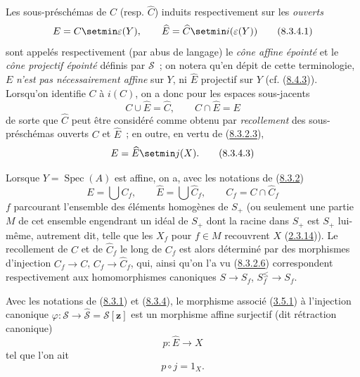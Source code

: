 \begin{env}[8.3.4]
\label{II.8.3.4-fr}
Les sous-préschémas de $C$ (resp. $\widehat{C}$) induits respectivement sur
les \emph{ouverts}
\begin{equation}
\label{II.8.3.4.1-fr}
  E=C\setmin\varepsilon(Y),\qquad
  \widehat{E}=\widehat{C}\setmin i(\varepsilon(Y))
\tag{8.3.4.1}
\end{equation}
sont appelés respectivement (par abus de langage) le \emph{cône affine
épointé} et le \emph{cône projectif épointé} définis par $\mathcal{S}$~; on
notera qu'en dépit de cette terminologie, $E$ \emph{n'est pas nécessairement
affine} sur $Y$, ni $\widehat{E}$ projectif sur $Y$
(cf. (\hyperref[II.8.4.3-fr]{8.4.3})). Lorsqu'on identifie $C$ à $i(C)$, on a
donc pour les espaces sous-jacents
\begin{equation}
\label{II.8.3.4.2-fr}
  C\cup\widehat{E}=\widehat{C},\qquad C\cap\widehat{E}=E
\tag{8.3.4.2}
\end{equation}
de sorte que $\widehat{C}$ peut être considéré comme obtenu par
\emph{recollement} des sous-préschémas ouverts $C$ et $\widehat{E}$~; en
outre, en vertu de (\hyperref[II.8.3.2.3-fr]{8.3.2.3}),
\begin{equation}
\label{II.8.3.4.3-fr}
  E=\widehat{E}\setmin j(X).
\tag{8.3.4.3}
\end{equation}

Lorsque $Y=\operatorname{Spec}(A)$ est affine, on a, avec les notations de
(\hyperref[II.8.3.2-fr]{8.3.2})
\begin{equation}
\label{II.8.3.4.4-fr}
  E=\bigcup C_f,\qquad
  \widehat{E}=\bigcup\widehat{C}_f,\qquad
  C_f=C\cap\widehat{C}_f
\tag{8.3.4.4}
\end{equation}
$f$ parcourant l'ensemble des éléments homogènes de $S_+$ (ou seulement une
partie $M$ de cet ensemble engendrant un idéal de $S_+$ dont la racine dans
$S_+$ est $S_+$ lui-même, autrement dit, telle que les $X_f$ pour $f\in M$
recouvrent $X$ (\hyperref[II.2.3.14-fr]{2.3.14})). Le recollement de $C$ et de
$\widehat{C}_f$ le long de $C_f$ est alors déterminé par des morphismes
d'injection $C_f\to C$, $C_f\to\widehat{C}_f$, qui, ainsi qu'on l'a vu
(\hyperref[II.8.3.2.6-fr]{8.3.2.6}) correspondent respectivement aux
homomorphismes canoniques $S\to S_f$, $S_f^{\leq}\to S_f$.
\end{env}

\begin{proposition}[8.3.5]
\label{II.8.3.5-fr}
Avec les notations de \textup{(\hyperref[II.8.3.1-fr]{8.3.1})} et
\textup{(\hyperref[II.8.3.4-fr]{8.3.4})}, le morphisme associé
\textup{(\hyperref[II.3.5.1-fr]{3.5.1})} à l'injection canonique
$\varphi:\mathcal{S}\to\widehat{\mathcal{S}}=\mathcal{S}[\mathbf{z}]$ est un morphisme
affine surjectif \textup{(dit} rétraction canonique)
\begin{equation}
\label{II.8.3.5.1-fr}
  p:\widehat{E}\to X
\tag{8.3.5.1}
\end{equation}
tel que l'on ait
\begin{equation}
\label{II.8.3.5.2-fr}
  p\circ j=1_X.
\tag{8.3.5.2}
\end{equation}
\end{proposition}

